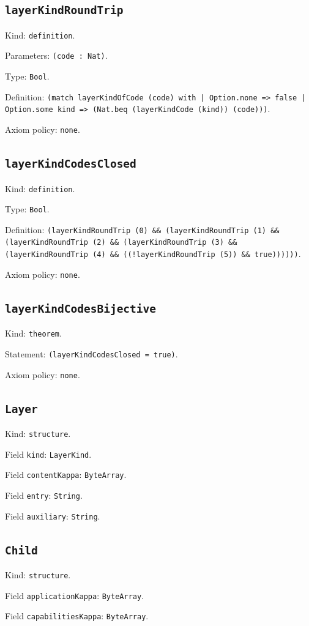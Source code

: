 \documentclass[11pt]{article}
\begin{document}
\subsection*{\texttt{layerKindRoundTrip}}
\noindent Kind: \texttt{definition}.\par
\noindent Parameters: \texttt{(code : Nat)}.\par
\noindent Type: \texttt{Bool}.\par
\noindent Definition: \texttt{(match layerKindOfCode (code) with | Option.none => false | Option.some kind => (Nat.beq (layerKindCode (kind)) (code)))}.\par
\noindent Axiom policy: \texttt{none}.\par
\subsection*{\texttt{layerKindCodesClosed}}
\noindent Kind: \texttt{definition}.\par
\noindent Type: \texttt{Bool}.\par
\noindent Definition: \texttt{(layerKindRoundTrip (0) \&\& (layerKindRoundTrip (1) \&\& (layerKindRoundTrip (2) \&\& (layerKindRoundTrip (3) \&\& (layerKindRoundTrip (4) \&\& ((!layerKindRoundTrip (5)) \&\& true))))))}.\par
\noindent Axiom policy: \texttt{none}.\par
\subsection*{\texttt{layerKindCodesBijective}}
\noindent Kind: \texttt{theorem}.\par
\noindent Statement: \texttt{(layerKindCodesClosed = true)}.\par
\noindent Axiom policy: \texttt{none}.\par
\subsection*{\texttt{Layer}}
\noindent Kind: \texttt{structure}.\par
\noindent Field \texttt{kind}: \texttt{LayerKind}.\par
\noindent Field \texttt{contentKappa}: \texttt{ByteArray}.\par
\noindent Field \texttt{entry}: \texttt{String}.\par
\noindent Field \texttt{auxiliary}: \texttt{String}.\par
\subsection*{\texttt{Child}}
\noindent Kind: \texttt{structure}.\par
\noindent Field \texttt{applicationKappa}: \texttt{ByteArray}.\par
\noindent Field \texttt{capabilitiesKappa}: \texttt{ByteArray}.\par
\end{document}
